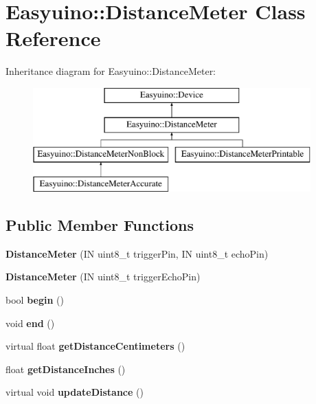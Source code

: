 \hypertarget{class_easyuino_1_1_distance_meter}{}\section{Easyuino\+:\+:Distance\+Meter Class Reference}
\label{class_easyuino_1_1_distance_meter}
Inheritance diagram for Easyuino\+:\+:Distance\+Meter\+:\begin{figure}[H]
\begin{center}
\leavevmode
\includegraphics[height=4.000000cm]{class_easyuino_1_1_distance_meter}
\end{center}
\end{figure}
\subsection*{Public Member Functions}
\begin{DoxyCompactItemize}
\item 
\mbox{\label{class_easyuino_1_1_distance_meter_aad61ebf8398ba5cf6a80e5defc29bfcc}} 
{\bfseries Distance\+Meter} (IN uint8\+\_\+t trigger\+Pin, IN uint8\+\_\+t echo\+Pin)
\item 
\mbox{\label{class_easyuino_1_1_distance_meter_aa5551cc3c42fe77f0972a41acf896cf9}} 
{\bfseries Distance\+Meter} (IN uint8\+\_\+t trigger\+Echo\+Pin)
\item 
\mbox{\label{class_easyuino_1_1_distance_meter_a0374e6f806cd71f0f918c6ea7b7700a0}} 
bool {\bfseries begin} ()
\item 
\mbox{\label{class_easyuino_1_1_distance_meter_a8a818cc922418ae5a078193dbfab1e6b}} 
void {\bfseries end} ()
\item 
\mbox{\label{class_easyuino_1_1_distance_meter_af1ce4460cc2818294a8b1f3fc6c00d64}} 
virtual float {\bfseries get\+Distance\+Centimeters} ()
\item 
\mbox{\label{class_easyuino_1_1_distance_meter_a4e3c650c54382d9af6bca51dcac4e7a3}} 
float {\bfseries get\+Distance\+Inches} ()
\item 
\mbox{\label{class_easyuino_1_1_distance_meter_a124a8975be3829cbf9f39c746853f5c3}} 
virtual void {\bfseries update\+Distance} ()
\end{DoxyCompactItemize}
